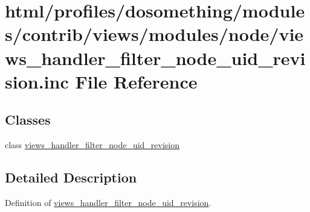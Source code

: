 \hypertarget{views__handler__filter__node__uid__revision_8inc}{
\section{html/profiles/dosomething/modules/contrib/views/modules/node/views\_\-handler\_\-filter\_\-node\_\-uid\_\-revision.inc File Reference}
\label{views__handler__filter__node__uid__revision_8inc}
}
\subsection*{Classes}
\begin{DoxyCompactItemize}
\item 
class \hyperlink{classviews__handler__filter__node__uid__revision}{views\_\-handler\_\-filter\_\-node\_\-uid\_\-revision}
\end{DoxyCompactItemize}


\subsection{Detailed Description}
Definition of \hyperlink{classviews__handler__filter__node__uid__revision}{views\_\-handler\_\-filter\_\-node\_\-uid\_\-revision}. 